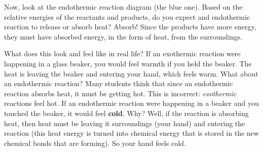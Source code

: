 Now, look at the endothermic reaction diagram (the blue one). Based on the
relative energies of the reactants and products, do you expect and endothermic
reaction to release or absorb heat? Absorb! Since the products have more
energy, they must have absorbed energy, in the form of heat, from the surroundings.

What does this look and feel like in real life? If an exothermic reaction were
happening in a glass beaker, you would feel warmth if you held the beaker. The
heat is leaving the beaker and entering your hand, which feels warm. What
about an endothermic reaction? Many students think that since an endothermic
reaction absorbs heat, it must be getting hot. This is incorrect:
\textit{exothermic} reactions feel hot. If an endothermic reaction were
happening in a beaker and you touched the beaker, it would feel \textbf{cold}.
Why? Well, if the reaction is absorbing heat, then heat must be leaving it
surroundings (your hand) and entering the reaction (this heat energy is turned
into chemical energy that is stored in the new chemical bonds that are
forming). So your hand feels cold. %
